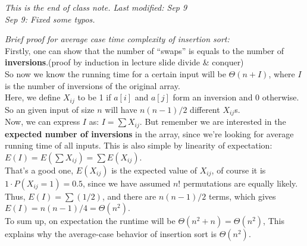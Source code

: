 \documentclass[11pt, a4paper]{COMP3711}
\begin{document}
\begin{spacing}{1.5}
    {\it This is the end of class note. Last modified: Sep 9\\
    Sep 9: Fixed some typos.}


    \newpage
    {\it Brief proof for average case time complexity of 
    insertion sort:} \\
    Firstly, one can show that the number of ``swaps'' 
    is equals to the number of {\bf inversions}.(proof by induction in 
    lecture slide divide \& conquer)\\
    So now we know the running time for a certain input
    will be $\Theta(n+I)$, 
    where $I$ is the number of inversions of the original array.\\
    Here, we define $X_{ij}$ to be 1 if $a[i]$ and $a[j]$ form 
    an inversion and 0 otherwise. So an given input of size $n$
    will have $n(n-1)/2$ different $X_{ij}$s.\\
    Now, we can express $I$ as: $I=\sum X_{ij}$. But 
    remember we are interested in the {\bf expected number 
    of inversions} in the array, since we're looking for average 
    running time of all inputs. This is also simple by 
    linearity of expectation: $E(I)=E(\sum X_{ij})=\sum E(X_{ij})$.\\
    That's a good one, $E(X_{ij})$ is the expected value
    of $X_{ij}$, of course it is $1\cdot P(X_{ij}=1)=0.5$, 
    since we have assumed $n!$ permutations are equally likely.\\
    Thus, $E(I)=\sum (1/2)$, and there are $n(n-1)/2$ terms,
    which gives $E(I)=n(n-1)/4=\Theta(n^2)$.\\
    To sum up, on expectation the runtime will be
    $\Theta(n^2+n)=\Theta(n^2)$, This explains why the average-case 
    behavior of insertion sort is $\Theta(n^2)$.
\end{spacing}
\end{document}
